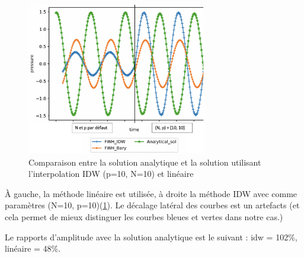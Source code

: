 \begin{figure}[H]
    \centering
    \includegraphics[width=0.70\textwidth]{images/rapport_a_np.png}
    \caption{Comparaison entre la solution analytique et la solution utilisant l'interpolation IDW (p=10, N=10) et linéaire}
    \label{fig:np10}
\end{figure}

À gauche, la méthode linéaire est utilisée, à droite la méthode IDW avec comme paramètres (N=10, p=10)(\ref{fig:np10}). Le décalage latéral des courbes est un artefacts (et cela permet de mieux distinguer les courbes bleues et vertes dans notre cas.)

Le rapports d'amplitude avec la solution analytique est le suivant : idw = 102\%, linéaire = 48\%. %






